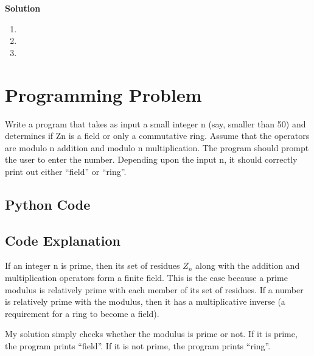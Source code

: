 \documentclass[11pt]{article}
\begin{document}
\textbf{Solution}
\begin{enumerate}[label=(\alph*)]
\item 
\item 
\item 
\end{enumerate}

\pagebreak

\section{Programming Problem}

Write a program that takes as input a small integer n (say, smaller than 50) and determines if Zn is a field or only a commutative ring. Assume that the operators are modulo n addition and modulo n multiplication. The program should prompt the user to enter the number. Depending upon the input n, it should correctly print out either ``field'' or ``ring''.

\subsection{Python Code}

\pagebreak

\subsection{Code Explanation}
If an integer n is prime, then its set of residues $Z_n$ along with the addition and multiplication operators form a finite field. This is the case because a prime modulus is relatively prime with each member of its set of residues. If a number is relatively prime with the modulus, then it has a multiplicative inverse (a requirement for a ring to become a field).

My solution simply checks whether the modulus is prime or not. If it is prime, the program prints ``field''. If it is not prime, the program prints ``ring''.
\end{document}
